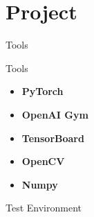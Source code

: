 \documentclass[presentation]{beamer}\mode<presentation>{\usetheme{AMSBolognaFC}}
\begin{document}
\section{Project}

\begin{frame}{Tools}
\begin{block}{Tools}
	\begin{itemize}
		\item \textbf{PyTorch}
		\item \textbf{OpenAI Gym}
		\item \textbf{TensorBoard}
		\item \textbf{OpenCV}
		\item \textbf{Numpy}
	\end{itemize}
\end{block}
\end{frame}

\begin{frame}{Test Environment}

\end{frame}


\section*{}

\frame{\titlepage}

\section*{\refname}

\begin{frame}{\refname}
	\tiny
	\nocite{*}
	\printbibliography
\end{frame}

\end{document}
